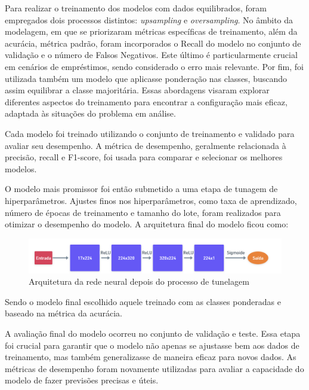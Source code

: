 Para realizar o treinamento dos modelos com dados equilibrados, foram empregados dois processos distintos: 
\textit{upsampling} e \textit{oversampling}. No âmbito da modelagem, em que se priorizaram métricas específicas
de treinamento, além da acurácia, métrica padrão, foram incorporados o Recall do modelo no conjunto de validação
e o número de Falsos Negativos. Este último é particularmente crucial em cenários de empréstimos, sendo considerado
o erro mais relevante. Por fim, foi utilizada também um modelo que aplicasse ponderação nas classes, buscando assim equilibrar 
a classe majoritária. Essas abordagens visaram explorar diferentes aspectos do treinamento para encontrar a 
configuração mais eficaz, adaptada às situações do problema em análise.


Cada modelo foi treinado utilizando 
o conjunto de treinamento e validado para avaliar seu desempenho. A métrica de desempenho, geralmente relacionada
à precisão, recall e F1-score, foi usada para comparar e selecionar os melhores modelos.

O modelo mais promissor foi então submetido a uma etapa de tunagem de hiperparâmetros. Ajustes finos nos 
hiperparâmetros, como taxa de aprendizado, número de épocas de treinamento e tamanho do lote, 
foram realizados para otimizar o desempenho do modelo.
A arquitetura final do modelo ficou como:

\begin{figure}[H]
  \centering
  \includegraphics[width=1\textwidth]{imagens/arquitetura_redeneural_vencedor.png}
  \caption{Arquitetura da rede neural depois do processo de tunelagem}
  \label{fig:imagens/arquitetura_redeneural_vencedor.png}
\end{figure}

Sendo o modelo final escolhido aquele treinado com as classes ponderadas e baseado na métrica da 
acurácia.

A avaliação final do modelo ocorreu no conjunto de validação e teste. Essa etapa foi crucial 
para garantir que o modelo não apenas se ajustasse bem aos dados de treinamento, mas também 
generalizasse de maneira eficaz para novos dados. As métricas de desempenho foram novamente
utilizadas para avaliar a capacidade do modelo de fazer previsões precisas e úteis.

